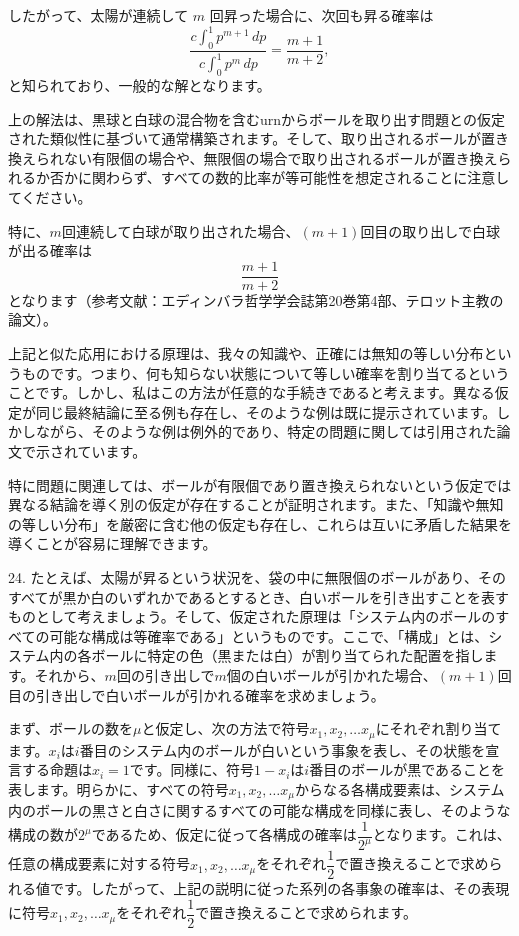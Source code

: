 \documentclass[a4paper,11pt,openany]{ltjsbook}
\begin{document}
したがって、太陽が連続して $m$ 回昇った場合に、次回も昇る確率は
\[
  \frac{c \int_0^1 p^{m+1} \, dp}{c \int_0^1 p^m \, dp} = \frac{m+1}{m+2},
\]
と知られており、一般的な解となります。

上の解法は、黒球と白球の混合物を含むurnからボールを取り出す問題との仮定された類似性に基づいて通常構築されます。そして、取り出されるボールが置き換えられない有限個の場合や、無限個の場合で取り出されるボールが置き換えられるか否かに関わらず、すべての数的比率が等可能性を想定されることに注意してください。

特に、$m$回連続して白球が取り出された場合、$(m+1)$回目の取り出しで白球が出る確率は
\[
  \frac{m + 1}{m + 2}
\]
となります（参考文献：エディンバラ哲学学会誌第20巻第4部、テロット主教の論文）。

上記と似た応用における原理は、我々の知識や、正確には無知の等しい分布というものです。つまり、何も知らない状態について等しい確率を割り当てるということです。しかし、私はこの方法が任意的な手続きであると考えます。異なる仮定が同じ最終結論に至る例も存在し、そのような例は既に提示されています。しかしながら、そのような例は例外的であり、特定の問題に関しては引用された論文で示されています。

特に問題に関連しては、ボールが有限個であり置き換えられないという仮定では異なる結論を導く別の仮定が存在することが証明されます。また、「知識や無知の等しい分布」を厳密に含む他の仮定も存在し、これらは互いに矛盾した結果を導くことが容易に理解できます。

24. たとえば、太陽が昇るという状況を、袋の中に無限個のボールがあり、そのすべてが黒か白のいずれかであるとするとき、白いボールを引き出すことを表すものとして考えましょう。そして、仮定された原理は「システム内のボールのすべての可能な構成は等確率である」というものです。ここで、「構成」とは、システム内の各ボールに特定の色（黒または白）が割り当てられた配置を指します。それから、$m$回の引き出しで$m$個の白いボールが引かれた場合、$(m+1)$回目の引き出しで白いボールが引かれる確率を求めましょう。

まず、ボールの数を$\mu$と仮定し、次の方法で符号$x_1, x_2, \dotsc x_\mu$にそれぞれ割り当てます。$x_i$は$i$番目のシステム内のボールが白いという事象を表し、その状態を宣言する命題は$x_i = 1$です。同様に、符号$1-x_i$は$i$番目のボールが黒であることを表します。明らかに、すべての符号$x_1, x_2,\dotsc x_\mu$からなる各構成要素は、システム内のボールの黒さと白さに関するすべての可能な構成を同様に表し、そのような構成の数が$2^\mu$であるため、仮定に従って各構成の確率は$\dfrac{1}{2^\mu}$となります。これは、任意の構成要素に対する符号$x_1, x_2,\dotsc x_\mu$をそれぞれ$\dfrac{1}{2}$で置き換えることで求められる値です。したがって、上記の説明に従った系列の各事象の確率は、その表現に符号$x_1, x_2,\dotsc x_\mu$をそれぞれ$\dfrac{1}{2}$で置き換えることで求められます。
\end{document}

